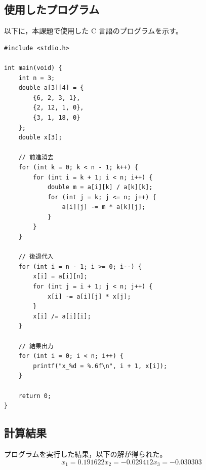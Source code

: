 \documentclass[10pt,a4paper,titlepage]{jreport} %
\begin{document}
\subsection*{使用したプログラム}
以下に，本課題で使用した C 言語のプログラムを示す。

\begin{lstlisting}
#include <stdio.h>

int main(void) {
    int n = 3;
    double a[3][4] = {
        {6, 2, 3, 1},
        {2, 12, 1, 0},
        {3, 1, 18, 0}
    };
    double x[3];

    // 前進消去
    for (int k = 0; k < n - 1; k++) {
        for (int i = k + 1; i < n; i++) {
            double m = a[i][k] / a[k][k];
            for (int j = k; j <= n; j++) {
                a[i][j] -= m * a[k][j];
            }
        }
    }

    // 後退代入
    for (int i = n - 1; i >= 0; i--) {
        x[i] = a[i][n];
        for (int j = i + 1; j < n; j++) {
            x[i] -= a[i][j] * x[j];
        }
        x[i] /= a[i][i];
    }

    // 結果出力
    for (int i = 0; i < n; i++) {
        printf("x_%d = %.6f\n", i + 1, x[i]);
    }

    return 0;
}
\end{lstlisting}

\subsection*{計算結果}
プログラムを実行した結果，以下の解が得られた。
\[
x_1 = 0.191622
x_2 = -0.029412
x_3 = -0.030303
\]
\end{document}
